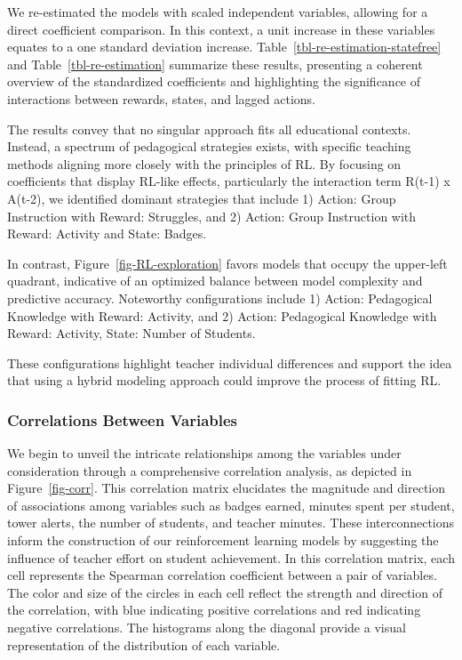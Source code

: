 \documentclass[
  number,
  preprint,
  3p,
  onecolumn]{elsarticle}
\begin{document}
We re-estimated the models with scaled independent variables, allowing
for a direct coefficient comparison. In this context, a unit increase in
these variables equates to a one standard deviation increase.
Table~\ref{tbl-re-estimation-statefree} and
Table~\ref{tbl-re-estimation} summarize these results, presenting a
coherent overview of the standardized coefficients and highlighting the
significance of interactions between rewards, states, and lagged
actions.

The results convey that no singular approach fits all educational
contexts. Instead, a spectrum of pedagogical strategies exists, with
specific teaching methods aligning more closely with the principles of
RL. By focusing on coefficients that display RL-like effects,
particularly the interaction term R(t-1) x A(t-2), we identified
dominant strategies that include 1) Action: Group Instruction with
Reward: Struggles, and 2) Action: Group Instruction with Reward:
Activity and State: Badges.

In contrast, Figure~\ref{fig-RL-exploration} favors models that occupy
the upper-left quadrant, indicative of an optimized balance between
model complexity and predictive accuracy. Noteworthy configurations
include 1) Action: Pedagogical Knowledge with Reward: Activity, and 2)
Action: Pedagogical Knowledge with Reward: Activity, State: Number of
Students.

These configurations highlight teacher individual differences and
support the idea that using a hybrid modeling approach could improve the
process of fitting RL.

\subsubsection{Correlations Between
Variables}\label{correlations-between-variables}

We begin to unveil the intricate relationships among the variables under
consideration through a comprehensive correlation analysis, as depicted
in Figure~\ref{fig-corr}. This correlation matrix elucidates the
magnitude and direction of associations among variables such as badges
earned, minutes spent per student, tower alerts, the number of students,
and teacher minutes. These interconnections inform the construction of
our reinforcement learning models by suggesting the influence of teacher
effort on student achievement. In this correlation matrix, each cell
represents the Spearman correlation coefficient between a pair of
variables. The color and size of the circles in each cell reflect the
strength and direction of the correlation, with blue indicating positive
correlations and red indicating negative correlations. The histograms
along the diagonal provide a visual representation of the distribution
of each variable.
\end{document}
